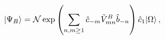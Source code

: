 \begin{equation}
|\Psi _{B}\rangle =\mathcal{N}\exp \left( \sum_{n,m\geq 1}\hat{c}_{-m}{%
\tilde{V}}_{mn}^{B}\hat{b}_{-n}\right) \hat{c}_{1}|\Omega \rangle \,,
\end{equation}

